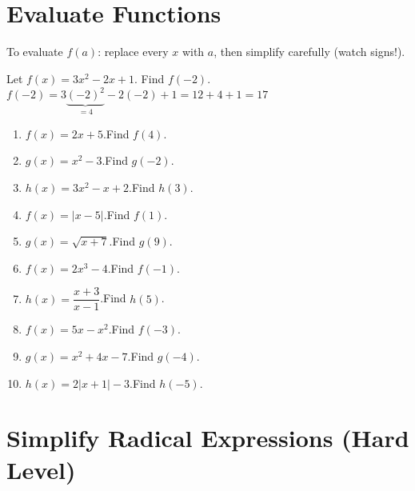 \documentclass[11pt]{article}
\begin{document}
\newpage
\section{Evaluate Functions}

\begin{tcolorbox}[keybox,title={Key Concept}]
To evaluate $f(a)$: replace every $x$ with $a$, then simplify carefully (watch signs!).
\end{tcolorbox}

\begin{tcolorbox}[exbox,title={Example}]
Let $f(x)=3x^2-2x+1$. Find $f(-2)$.\\[4pt]
$f(-2)=3\underbrace{(-2)^2}_{=4}-2(-2)+1=12+4+1=\boxed{17}$
\end{tcolorbox}

\begin{enumerate}[leftmargin=*,label=\textbf{\arabic*.}]
\item $f(x)=2x+5$.\quad Find $f(4)$.\vspace{1.8cm}
\item $g(x)=x^2-3$.\quad Find $g(-2)$.\vspace{1.8cm}
\item $h(x)=3x^2-x+2$.\quad Find $h(3)$.\vspace{1.8cm}
\item $f(x)=|x-5|$.\quad Find $f(1)$.\vspace{1.8cm}
\item $g(x)=\sqrt{x+7}$.\quad Find $g(9)$.\vspace{1.8cm}
\item $f(x)=2x^3-4$.\quad Find $f(-1)$.\vspace{1.8cm}
\item $h(x)=\dfrac{x+3}{x-1}$.\quad Find $h(5)$.\vspace{2.0cm}
\item $f(x)=5x-x^2$.\quad Find $f(-3)$.\vspace{1.8cm}
\item $g(x)=x^2+4x-7$.\quad Find $g(-4)$.\vspace{1.8cm}
\item $h(x)=2|x+1|-3$.\quad Find $h(-5)$.\vspace{1.8cm}
\end{enumerate}

\newpage
\section{Simplify Radical Expressions \textnormal{\small(Hard Level)}}
\end{document}
